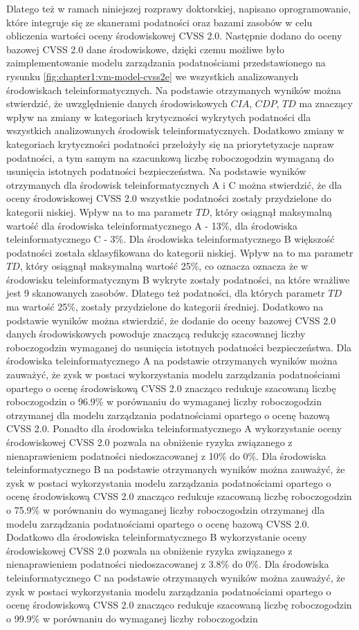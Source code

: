 Dlatego też w ramach niniejszej rozprawy doktorskiej, napisano oprogramowanie, które integruje się ze skanerami podatności oraz bazami zasobów w celu obliczenia wartości oceny środowiskowej CVSS 2.0. Następnie dodano do oceny bazowej CVSS 2.0 dane środowiskowe, dzięki czemu możliwe było zaimplementowanie modelu zarządzania podatnościami przedstawionego na rysunku \ref{fig:chapter1:vm-model-cvss2e} we wszystkich analizowanych środowiskach teleinformatycznych. Na podstawie otrzymanych wyników można stwierdzić, że uwzględnienie danych środowiskowych $CIA$, $CDP$, $TD$ ma znaczący wpływ na zmiany w kategoriach krytyczności wykrytych podatności dla wszystkich analizowanych środowisk teleinformatycznych. Dodatkowo zmiany w kategoriach krytyczności podatności przełożyły się na priorytetyzacje napraw podatności, a tym samym na szacunkową liczbę roboczogodzin wymaganą do usunięcia istotnych podatności bezpieczeństwa. Na podstawie wyników otrzymanych dla środowisk teleinformatycznych A i C można stwierdzić, że dla oceny środowiskowej CVSS 2.0 wszystkie podatności zostały przydzielone do kategorii niskiej. Wpływ na to ma parametr $TD$, który osiągnął maksymalną wartość dla środowiska teleinformatycznego A - 13\%, dla środowiska teleinformatycznego C - 3\%. Dla środowiska teleinformatycznego B większość podatności została sklasyfikowana do kategorii niskiej. Wpływ na to ma parametr $TD$, który osiągnął maksymalną wartość 25\%, co oznacza oznacza że w środowisku teleinformatycznym B wykryte zostały podatności, na które wrażliwe jest 9 skanowanych zasobów. Dlatego też podatności, dla których parametr $TD$ ma wartość 25\%, zostały przydzielone do kategorii średniej. Dodatkowo na podstawie wyników można stwierdzić, że dodanie do oceny bazowej CVSS 2.0 danych środowiskowych powoduje znaczącą redukcję szacowanej liczby roboczogodzin wymaganej do usunięcia istotnych podatności bezpieczeństwa. Dla środowiska teleinformatycznego A na podstawie otrzymanych wyników można zauważyć, że zysk w postaci wykorzystania modelu zarządzania podatnościami opartego o ocenę środowiskową CVSS 2.0 znacząco redukuje szacowaną liczbę roboczogodzin o 96.9\% w porównaniu do wymaganej liczby roboczogodzin otrzymanej dla modelu zarządzania podatnościami opartego o ocenę bazową CVSS 2.0. Ponadto dla środowiska teleinformatycznego A wykorzystanie oceny środowiskowej CVSS 2.0 pozwala na obniżenie ryzyka związanego z nienaprawieniem podatności niedoszacowanej z 10\% do 0\%. Dla środowiska teleinformatycznego B na podstawie otrzymanych wyników można zauważyć, że zysk w postaci wykorzystania modelu zarządzania podatnościami opartego o ocenę środowiskową CVSS 2.0 znacząco redukuje szacowaną liczbę roboczogodzin o 75.9\% w porównaniu do wymaganej liczby roboczogodzin otrzymanej dla modelu zarządzania podatnościami opartego o ocenę bazową CVSS 2.0. Dodatkowo dla środowiska teleinformatycznego B wykorzystanie oceny środowiskowej CVSS 2.0 pozwala na obniżenie ryzyka związanego z nienaprawieniem podatności niedoszacowanej z 3.8\% do 0\%. Dla środowiska teleinformatycznego C na podstawie otrzymanych wyników można zauważyć, że zysk w postaci wykorzystania modelu zarządzania podatnościami opartego o ocenę środowiskową CVSS 2.0 znacząco redukuje szacowaną liczbę roboczogodzin o 99.9\% w porównaniu do wymaganej liczby roboczogodzin 